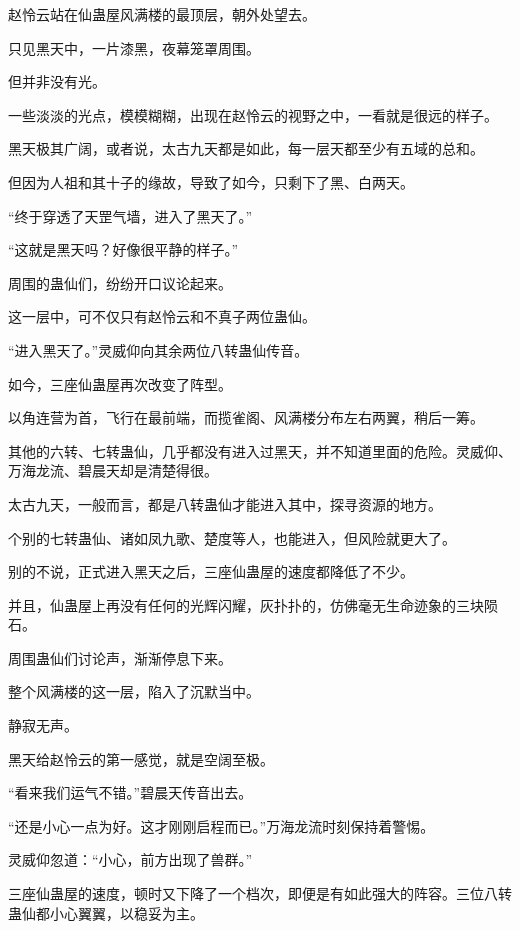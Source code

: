
\begin{this_body}

赵怜云站在仙蛊屋风满楼的最顶层，朝外处望去。

只见黑天中，一片漆黑，夜幕笼罩周围。

但并非没有光。

一些淡淡的光点，模模糊糊，出现在赵怜云的视野之中，一看就是很远的样子。

黑天极其广阔，或者说，太古九天都是如此，每一层天都至少有五域的总和。

但因为人祖和其十子的缘故，导致了如今，只剩下了黑、白两天。

“终于穿透了天罡气墙，进入了黑天了。”

“这就是黑天吗？好像很平静的样子。”

周围的蛊仙们，纷纷开口议论起来。

这一层中，可不仅只有赵怜云和不真子两位蛊仙。

“进入黑天了。”灵威仰向其余两位八转蛊仙传音。

如今，三座仙蛊屋再次改变了阵型。

以角连营为首，飞行在最前端，而揽雀阁、风满楼分布左右两翼，稍后一筹。

其他的六转、七转蛊仙，几乎都没有进入过黑天，并不知道里面的危险。灵威仰、万海龙流、碧晨天却是清楚得很。

太古九天，一般而言，都是八转蛊仙才能进入其中，探寻资源的地方。

个别的七转蛊仙、诸如凤九歌、楚度等人，也能进入，但风险就更大了。

别的不说，正式进入黑天之后，三座仙蛊屋的速度都降低了不少。

并且，仙蛊屋上再没有任何的光辉闪耀，灰扑扑的，仿佛毫无生命迹象的三块陨石。

周围蛊仙们讨论声，渐渐停息下来。

整个风满楼的这一层，陷入了沉默当中。

静寂无声。

黑天给赵怜云的第一感觉，就是空阔至极。

“看来我们运气不错。”碧晨天传音出去。

“还是小心一点为好。这才刚刚启程而已。”万海龙流时刻保持着警惕。

灵威仰忽道：“小心，前方出现了兽群。”

三座仙蛊屋的速度，顿时又下降了一个档次，即便是有如此强大的阵容。三位八转蛊仙都小心翼翼，以稳妥为主。


\end{this_body}
